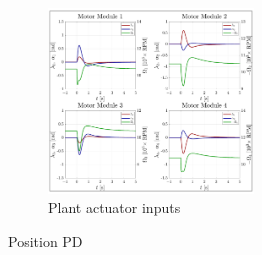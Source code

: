 \begin{figure}[htbp]
\begin{subfigure}{\textwidth}
\centering
\includegraphics[width=0.6\textwidth]{graphs/PD_Position_Input}
\vspace{-8pt}
\caption{Plant actuator inputs}
\label{fig:PD_Position_Input}
\end{subfigure}
\vspace{-8pt}
\caption{Position PD}
\vspace{-34pt}
\end{figure}
